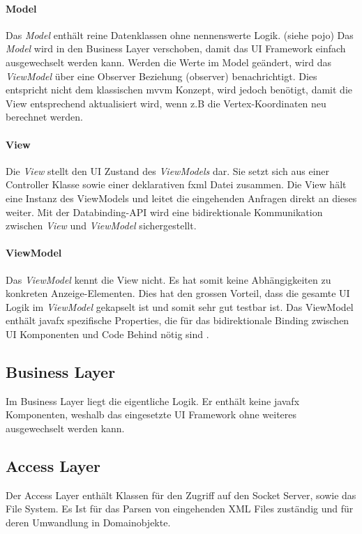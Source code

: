 \documentclass[11pt,a4paper,english,oneside]{book}
\numberwithin{equation}{chapter}
\begin{document}
	\paragraph{Model}
	Das \textit{Model} enthält reine Datenklassen ohne nennenswerte Logik. (siehe \gls{pojo}) Das \textit{Model} wird in den Business Layer verschoben, damit das UI Framework einfach ausgewechselt werden kann. Werden die Werte im Model geändert, wird das \textit{ViewModel} über eine Observer Beziehung (\gls{observer}) benachrichtigt. Dies entspricht nicht dem klassischen \gls{mvvm} Konzept, wird jedoch benötigt, damit die View entsprechend aktualisiert wird, wenn z.B die Vertex-Koordinaten neu berechnet werden.
	
	\paragraph{View}
	Die \textit{View} stellt den UI Zustand des \textit{ViewModels} dar. Sie setzt sich aus einer Controller Klasse sowie einer deklarativen \gls{fxml} Datei zusammen. Die View hält eine Instanz des ViewModels und leitet die eingehenden Anfragen direkt an dieses weiter. Mit der Databinding-API wird eine bidirektionale Kommunikation zwischen \textit{View} und \textit{ViewModel} sichergestellt. 
	
	\paragraph{ViewModel}
	Das \textit{ViewModel} kennt die View nicht. Es hat somit keine Abhängigkeiten zu konkreten Anzeige-Elementen. Dies hat den grossen Vorteil, dass die gesamte UI Logik im \textit{ViewModel} gekapselt ist und somit sehr gut testbar ist. Das ViewModel enthält \gls{javafx} spezifische Properties, die für das bidirektionale Binding zwischen UI Komponenten und Code Behind nötig sind \cite{javafxbook}.
	
	\subsection{Business Layer}
	Im Business Layer liegt die eigentliche Logik. Er enthält keine \gls{javafx} Komponenten, weshalb das eingesetzte UI Framework ohne weiteres ausgewechselt werden kann. 
	
	\subsection{Access Layer}
	Der Access Layer enthält Klassen für den Zugriff auf den Socket Server, sowie das File System. Es Ist für das Parsen von eingehenden XML Files zuständig und für deren Umwandlung in Domainobjekte.
\end{document}
